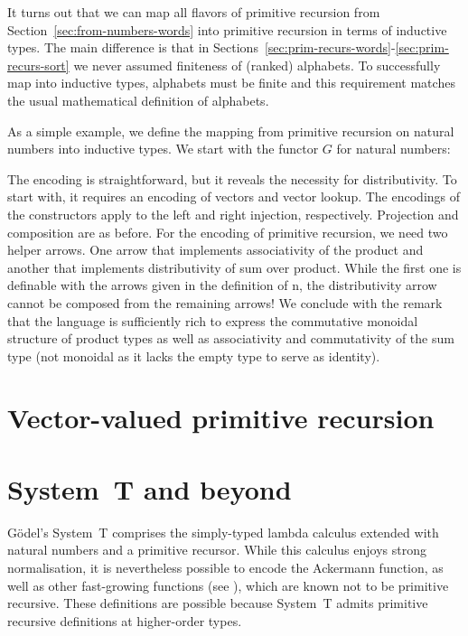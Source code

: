 \documentclass{jfp}
\begin{document}
It turns out that we can map all flavors of primitive recursion from
Section~\ref{sec:from-numbers-words} into primitive recursion in terms
of inductive types. The main difference is that in
Sections~\ref{sec:prim-recurs-words}-\ref{sec:prim-recurs-sort} we
never assumed finiteness of (ranked) alphabets. To successfully map into
inductive types, alphabets must be finite and this requirement
matches the usual mathematical definition of alphabets.

As a simple example, we define the mapping from primitive recursion on
natural numbers into inductive types. We start with the functor $G$
for natural numbers:
\ccDefGNat

The encoding is straightforward, but it reveals the necessity for
distributivity. To start with, it requires an 
encoding of vectors and vector lookup.
\ccFunMkvec
\ccDefNatToInd
The encodings of the constructors apply {\Afold} to the left and right
injection, respectively. Projection and composition are as before. For
the encoding of primitive recursion, we need two helper arrows. One
arrow that implements associativity of the product and another that
implements distributivity of sum over product. While the first one is
definable with the arrows given in the definition of {\APR n}, the
distributivity arrow cannot be composed from the remaining arrows!
\ccFunAssocDist
We conclude with the remark that the language is sufficiently rich to
express the commutative monoidal structure of product types as well as
associativity and commutativity of the sum type (not monoidal as it
lacks the empty type to serve as identity).

\section{Vector-valued primitive recursion}
\label{sec:vect-valu-prim}

\section{System~T and beyond}
\label{sec:system-t-beyond}

Gödel's System~T comprises the simply-typed lambda calculus extended
with natural numbers and a primitive recursor. While this calculus
enjoys strong normalisation, it is nevertheless possible to encode the
Ackermann function, as well as other fast-growing functions (see
\cite{DBLP:books/cu/Ha2016,DBLP:journals/corr/Widemann16}), which are known not 
to be primitive recursive. These definitions are possible because
System~T admits primitive recursive definitions at higher-order types.
\end{document}
